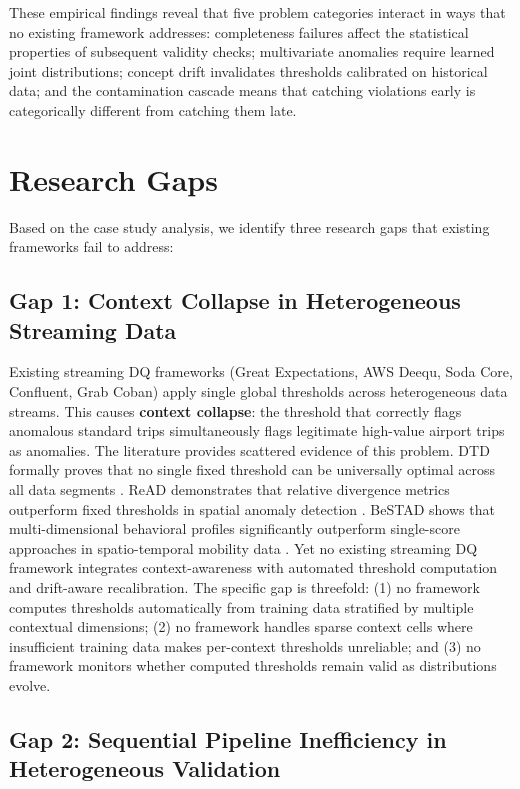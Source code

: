 These empirical findings reveal that five problem categories interact in ways that no existing framework addresses: completeness failures affect the statistical properties of subsequent validity checks; multivariate anomalies require learned joint distributions; concept drift invalidates thresholds calibrated on historical data; and the contamination cascade means that catching violations early is categorically different from catching them late.

\section{Research Gaps}

Based on the case study analysis, we identify three research gaps that existing frameworks fail to address:

\subsection{Gap 1: Context Collapse in Heterogeneous Streaming Data}

Existing streaming DQ frameworks (Great Expectations, AWS Deequ, Soda Core, Confluent, Grab Coban) apply single global thresholds across heterogeneous data streams. This causes \textbf{context collapse}: the threshold that correctly flags anomalous standard trips simultaneously flags legitimate high-value airport trips as anomalies. The literature provides scattered evidence of this problem. DTD formally proves that no single fixed threshold can be universally optimal across all data segments \citep{dtd2026}. ReAD demonstrates that relative divergence metrics outperform fixed thresholds in spatial anomaly detection \citep{read2020}. BeSTAD shows that multi-dimensional behavioral profiles significantly outperform single-score approaches in spatio-temporal mobility data \citep{bestad2025}. Yet no existing streaming DQ framework integrates context-awareness with automated threshold computation and drift-aware recalibration. The specific gap is threefold: (1) no framework computes thresholds automatically from training data stratified by multiple contextual dimensions; (2) no framework handles sparse context cells where insufficient training data makes per-context thresholds unreliable; and (3) no framework monitors whether computed thresholds remain valid as distributions evolve.

\subsection{Gap 2: Sequential Pipeline Inefficiency in Heterogeneous Validation}

